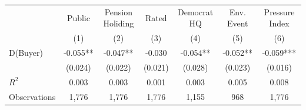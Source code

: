 {
\def\sym#1{\ifmmode^{#1}\else\(^{#1}\)\fi}
\begin{tabular}{l*{6}{c}}
\toprule
                    &\multicolumn{1}{c}{Public}&\multicolumn{1}{c}{Pension Holiding}&\multicolumn{1}{c}{Rated}&\multicolumn{1}{c}{Democrat HQ}&\multicolumn{1}{c}{Env. Event}&\multicolumn{1}{c}{Pressure Index}\\\cmidrule(lr){2-2}\cmidrule(lr){3-3}\cmidrule(lr){4-4}\cmidrule(lr){5-5}\cmidrule(lr){6-6}\cmidrule(lr){7-7}
                    &\multicolumn{1}{c}{(1)}   &\multicolumn{1}{c}{(2)}   &\multicolumn{1}{c}{(3)}   &\multicolumn{1}{c}{(4)}   &\multicolumn{1}{c}{(5)}   &\multicolumn{1}{c}{(6)}   \\
\midrule
D(Buyer)            &      -0.055** &      -0.047** &      -0.030   &      -0.054** &      -0.052** &      -0.059***\\
                    &     (0.024)   &     (0.022)   &     (0.021)   &     (0.028)   &     (0.023)   &     (0.016)   \\
\midrule
\(R^{2}\)           &       0.003   &       0.003   &       0.001   &       0.003   &       0.005   &       0.008   \\
Observations        &       1,776   &       1,776   &       1,776   &       1,155   &         968   &       1,776   \\
\bottomrule
\end{tabular}
}
